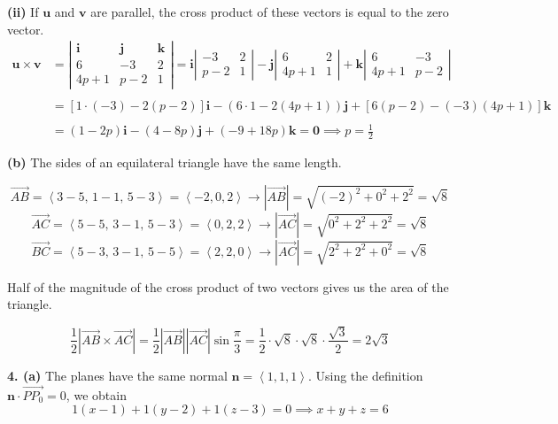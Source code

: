 \documentclass{article}
\begin{document}
\textbf{(ii)} If $\mathbf u$ and $\mathbf v$ are parallel, the cross product of these vectors is equal to the zero vector.
\begin{align*}\mathbf{u}\times\mathbf{v}&=\left|\begin{array}{ccc}
\mathbf{i}&\mathbf{j}&\mathbf{k}\\
6&-3&2\\
4p+1&p-2&1
\end{array}\right|=\mathbf{i}\left|\begin{array}{cc}
-3&2\\p-2&1
\end{array}\right|-\mathbf{j}\left|\begin{array}{cc}
6&2\\4p+1&1
\end{array}\right|+\mathbf{k}\left|\begin{array}{cc}
6&-3\\4p+1&p-2
\end{array}\right|\\\\&=[1\cdot(-3)-2(p-2)]\mathbf i-(6\cdot1-2(4p+1))\mathbf j+[6(p-2)-(-3)(4p+1)]\mathbf k\\\\&=(1-2p)\mathbf i-(4-8p)\mathbf j+(-9+18p)\mathbf k=\mathbf0\implies \boxed{p=\frac12}\end{align*}

\textbf{(b)} The sides of an equilateral triangle have the same length.

\[\overrightarrow{AB}=\left\langle3-5,\,1-1,\,5-3\right\rangle=\left\langle-2,0,2\right\rangle\rightarrow\left|\overrightarrow{AB}\right|=\sqrt{(-2)^2+0^2+2^2}=\sqrt8\]
\[\overrightarrow{AC}=\left\langle5-5,\,3-1,\,5-3\right\rangle=\left\langle0,2,2\right\rangle\rightarrow\left|\overrightarrow{AC}\right|=\sqrt{0^2+2^2+2^2}=\sqrt8\]
\[\overrightarrow{BC}=\left\langle5-3,\,3-1,\,5-5\right\rangle=\left\langle2,2,0\right\rangle\rightarrow\left|\overrightarrow{AC}\right|=\sqrt{2^2+2^2+0^2}=\sqrt8\]

Half of the magnitude of the cross product of two vectors gives us the area of the triangle.

\[\frac12\left|\overrightarrow{AB}\times\overrightarrow{AC}\right|=\frac12\left|\overrightarrow{AB}\right|\left|\overrightarrow{AC}\right|\sin\frac\pi3=\frac12\cdot\sqrt8\cdot\sqrt8\cdot\frac{\sqrt3}2=\boxed{2\sqrt3}\]

\vspace{1em}

\textbf{4. (a)} The planes have the same normal $\mathbf n=\left\langle1,1,1\right\rangle$. Using the definition $\mathbf n\cdot\overrightarrow{PP_0}=0$, we obtain
\[1(x-1)+1(y-2)+1(z-3)=0\implies\boxed{x+y+z=6}\]
\end{document}
